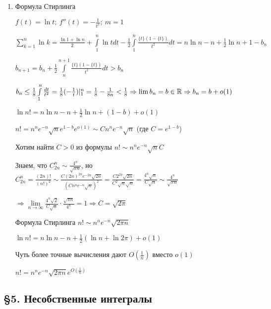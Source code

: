 \documentclass[12pt]{article}
\begin{document}
\begin{Example}{}
\begin{enumerate}
        \item Формула Стирлинга
        
        $f(t) = \ln{t};\ f''(t) = -\frac{1}{t^2};\ m = 1$

        $\sum\limits_{k = 1}^n \ln{k} = \frac{\ln{1} + \ln{n}}{2} + \int\limits_1^n \ln{t}dt - \frac{1}{2} \int\limits_1^n \frac{\{t\}(1 - \{t\})}{t^2}dt = n\ln{n} - n + \frac{1}{2}\ln{n} + 1 - b_n$

        $b_{n + 1} = b_n + \frac{1}{2}\int\limits_n^{n + 1} \frac{\{t\}(1 - \{t\})}{t^2}dt > b_n$

        $b_n \leq \frac{1}{8}\int\limits_1^n \frac{dt}{t^2} = \frac{1}{8} (- \frac{1}{t})|_1^n = \frac{1}{8} - \frac{1}{8n} < \frac{1}{8} \Rightarrow \lim b_n = b \in \mathbb R \Rightarrow b_n = b + o(1)$

        $\ln{n!} = n\ln{n} - n + \frac{1}{2}\ln{n} + (1 - b) + o(1)$

        $n! = n^ne^{-n}\sqrt{n}e^{1 - b}e^{o(1)} \sim C n^n e^{-n}\sqrt{n}$ (где $C = e^{1 - b}$)

        Хотим найти $C > 0$ из формулы $n! \sim n^ne^{-n}\sqrt{n}C$

        Знаем, что $C_{2n}^n \sim \frac{4^n}{\sqrt{\pi n}}$, но $C_{2n}^n = \frac{(2n)!}{(n!)^2} \sim \frac{C(2n)^{2n}e^{-2n}\sqrt{2n}}{(Cn^ne^{-n}\sqrt{n})^2} = \frac{C 2^{2n}\sqrt{2n}}{C^2 \sqrt{n} \sqrt{n}} = \frac{4^n\sqrt{n}}{C\sqrt{n}} \sim \frac{4^n}{\sqrt{\pi n}}$

        $\Rightarrow \lim\limits_{n \to \infty} \frac{4^n\sqrt{2}}{C\sqrt{n}}\cdot \frac{\sqrt{\pi n}}{4^n} = 1 \Rightarrow C = \sqrt{2\pi}$

        \begin{nota}{Формула Стирлинга}
            $n! \sim n^n e^{-n}\sqrt{2\pi n}$

            $\ln{n!} = n\ln{n} - n + \frac{1}{2}(\ln n + \ln{2\pi}) + o(1)$
        \end{nota}

        \begin{Remark}{}
            Чуть более точные вычисления дают $O(\frac{1}{n})$ вместо $o(1)$

            $n! = n^ne^{-n} \sqrt{2\pi n} e^{O(\frac{1}{n})}$
        \end{Remark}
    \end{enumerate}
\end{Example}

\subsection{\S 5. Несобственные интегралы}
\end{document}
